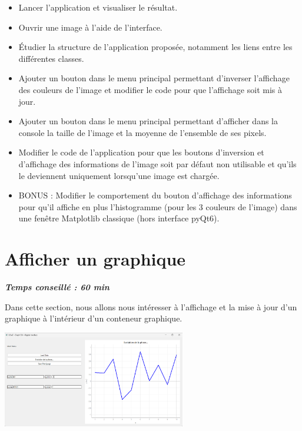 \documentclass[a4paper,11pt,titlepage]{article} %
\begin{document}
\begin{itemize}
	\item Lancer l'application et visualiser le résultat.
	\item Ouvrir une image à l'aide de l'interface.
	\item Étudier la structure de l'application proposée, notamment les liens entre les différentes classes.

	\medskip	
	
	\item Ajouter un bouton dans le menu principal permettant d'inverser l'affichage des couleurs de l'image et modifier le code pour que l'affichage soit mis à jour.
	\item Ajouter un bouton dans le menu principal permettant d'afficher dans la console la taille de l'image et la moyenne de l'ensemble de ses pixels.
	\item Modifier le code de l'application pour que les boutons d'inversion et d'affichage des informations de l'image soit par défaut non utilisable et qu'ils le deviennent uniquement lorsqu'une image est chargée.
	\item BONUS : Modifier le comportement du bouton d'affichage des informations pour qu'il affiche en plus l'histogramme (pour les 3 couleurs de l'image) dans une fenêtre Matplotlib classique (hors interface pyQt6).
\end{itemize}

\newpage
\section{Afficher un graphique}

\begin{center} \textbf{\textit{Temps conseillé : 60 min}} \end{center}

Dans cette section, nous allons nous intéresser à l'affichage et la mise à jour d'un graphique à l'intérieur d'un conteneur graphique.

\begin{center}
	\includegraphics[width=0.6\textwidth]{images/graph_gui.png}
\end{center}
\end{document}
